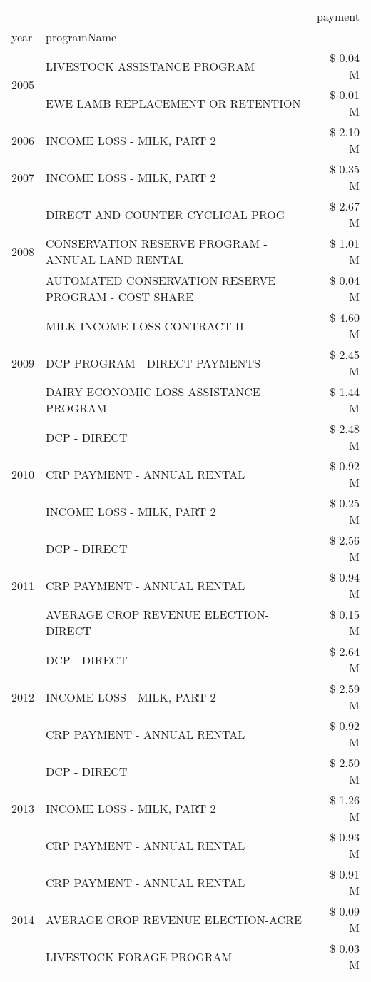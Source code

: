 \begin{tabular}{llr}
\toprule
 &  & payment \\
year & programName &  \\
\midrule
\multirow[t]{2}{*}{2005} & LIVESTOCK ASSISTANCE PROGRAM & \$ 0.04 M \\
 & EWE LAMB REPLACEMENT OR RETENTION & \$ 0.01 M \\
\cline{1-3}
2006 & INCOME LOSS - MILK, PART 2 & \$ 2.10 M \\
\cline{1-3}
2007 & INCOME LOSS - MILK, PART 2 & \$ 0.35 M \\
\cline{1-3}
\multirow[t]{3}{*}{2008} & DIRECT AND COUNTER CYCLICAL PROG & \$ 2.67 M \\
 & CONSERVATION RESERVE PROGRAM - ANNUAL LAND RENTAL & \$ 1.01 M \\
 & AUTOMATED CONSERVATION RESERVE PROGRAM - COST SHARE & \$ 0.04 M \\
\cline{1-3}
\multirow[t]{3}{*}{2009} & MILK INCOME LOSS CONTRACT II & \$ 4.60 M \\
 & DCP PROGRAM - DIRECT PAYMENTS & \$ 2.45 M \\
 & DAIRY ECONOMIC LOSS ASSISTANCE PROGRAM & \$ 1.44 M \\
\cline{1-3}
\multirow[t]{3}{*}{2010} & DCP - DIRECT & \$ 2.48 M \\
 & CRP PAYMENT - ANNUAL RENTAL & \$ 0.92 M \\
 & INCOME LOSS - MILK, PART 2 & \$ 0.25 M \\
\cline{1-3}
\multirow[t]{3}{*}{2011} & DCP - DIRECT & \$ 2.56 M \\
 & CRP PAYMENT - ANNUAL RENTAL & \$ 0.94 M \\
 & AVERAGE CROP REVENUE ELECTION-DIRECT & \$ 0.15 M \\
\cline{1-3}
\multirow[t]{3}{*}{2012} & DCP - DIRECT & \$ 2.64 M \\
 & INCOME LOSS - MILK, PART 2 & \$ 2.59 M \\
 & CRP PAYMENT - ANNUAL RENTAL & \$ 0.92 M \\
\cline{1-3}
\multirow[t]{3}{*}{2013} & DCP - DIRECT & \$ 2.50 M \\
 & INCOME LOSS - MILK, PART 2 & \$ 1.26 M \\
 & CRP PAYMENT - ANNUAL RENTAL & \$ 0.93 M \\
\cline{1-3}
\multirow[t]{3}{*}{2014} & CRP PAYMENT - ANNUAL RENTAL & \$ 0.91 M \\
 & AVERAGE CROP REVENUE ELECTION-ACRE & \$ 0.09 M \\
 & LIVESTOCK FORAGE PROGRAM & \$ 0.03 M \\

\end{tabular}
